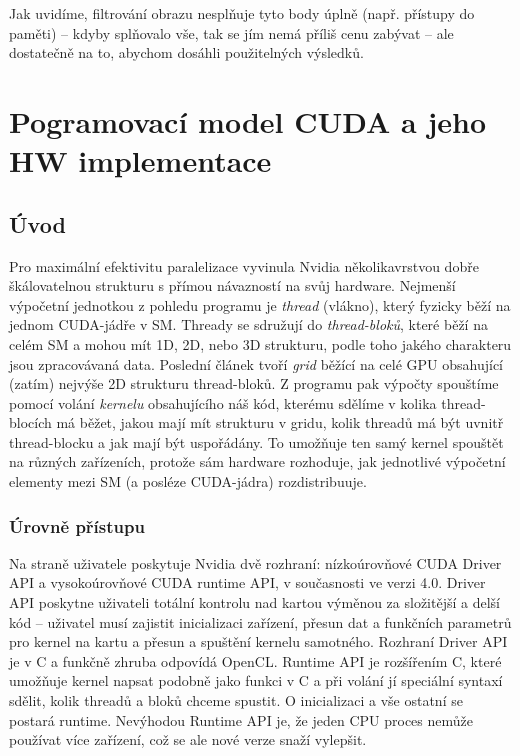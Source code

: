        Jak uvidíme, filtrování obrazu nesplňuje tyto body úplně (např. přístupy do paměti) -- kdyby splňovalo vše, tak se jím nemá příliš cenu zabývat -- ale dostatečně na to, abychom dosáhli použitelných výsledků.

\section{Pogramovací model CUDA a jeho HW implementace}

    \subsection{Úvod}
    Pro maximální efektivitu paralelizace vyvinula Nvidia několikavrstvou dobře škálovatelnou strukturu s přímou návazností na svůj hardware. Nejmenší výpočetní jednotkou z pohledu programu je \emph{thread} (vlákno), který fyzicky běží na jednom CUDA-jádře v SM. Thready se sdružují do \emph{thread-bloků}, které běží na celém SM a mohou mít 1D, 2D, nebo 3D strukturu, podle toho jakého charakteru jsou zpracovávaná data. Poslední článek tvoří \emph{grid} běžící na celé GPU obsahující (zatím) nejvýše 2D strukturu thread-bloků. Z programu pak výpočty spouštíme pomocí volání \emph{kernelu} obsahujícího náš kód, kterému sdělíme v kolika thread-blocích má běžet, jakou mají mít strukturu v gridu, kolik threadů má být uvnitř thread-blocku a jak mají být uspořádány. To umožňuje ten samý kernel spouštět na různých zařízeních, protože sám hardware rozhoduje, jak jednotlivé výpočetní elementy mezi SM (a posléze CUDA-jádra) rozdistribuuje.

    \subsubsection{Úrovně přístupu}

    Na straně uživatele poskytuje Nvidia dvě rozhraní: nízkoúrovňové CUDA Driver API a vysokoúrovňové CUDA runtime API, v současnosti ve verzi 4.0. Driver API poskytne uživateli totální kontrolu nad kartou výměnou za složitější a delší kód -- uživatel musí zajistit inicializaci zařízení, přesun dat a funkčních parametrů pro kernel na kartu a přesun a spuštění kernelu samotného. Rozhraní Driver API je v C a funkčně zhruba odpovídá OpenCL. Runtime API je rozšířením C, které umožňuje kernel napsat podobně jako funkci v C a při volání jí speciální syntaxí sdělit, kolik threadů a bloků chceme spustit. O inicializaci a vše ostatní se postará runtime. Nevýhodou Runtime API je, že jeden CPU proces nemůže používat více zařízení, což se ale nové verze snaží vylepšit.

